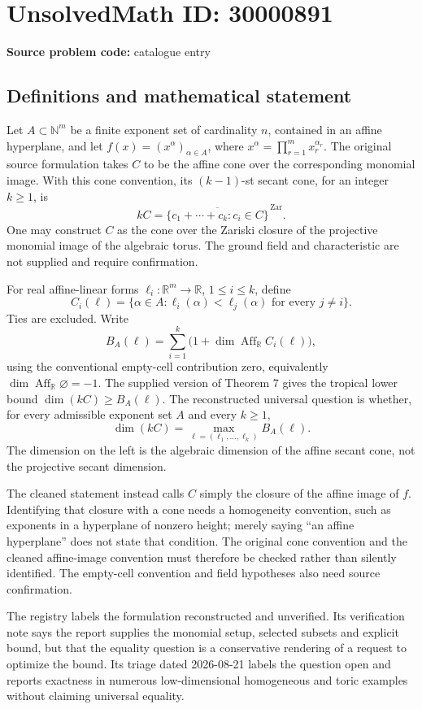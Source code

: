 \documentclass[11pt]{article}
\newcommand{\N}{\mathbb{N}}
\newcommand{\R}{\mathbb{R}}
\begin{document}
\section*{UnsolvedMath ID: 30000891}
\textbf{Source problem code:} catalogue entry
\subsection{Definitions and mathematical statement}
Let $A\subset\N^m$ be a finite exponent set of cardinality $n$, contained in an affine hyperplane, and let $f(x)=(x^\alpha)_{\alpha\in A}$, where $x^\alpha=\prod_{r=1}^m x_r^{\alpha_r}$. The original source formulation takes $C$ to be the affine cone over the corresponding monomial image. With this cone convention, its $(k-1)$-st secant cone, for an integer $k\geq1$, is
\[
kC=\overline{\{c_1+\cdots+c_k:c_i\in C\}}^{\,\mathrm{Zar}}.
\]
One may construct $C$ as the cone over the Zariski closure of the projective monomial image of the algebraic torus. The ground field and characteristic are not supplied and require confirmation.

For real affine-linear forms $\ell_i:\R^m\to\R$, $1\leq i\leq k$, define
\[
C_i(\ell)=\{\alpha\in A:\ell_i(\alpha)<\ell_j(\alpha)\text{ for every }j\ne i\}.
\]
Ties are excluded. Write
\[
B_A(\ell)=\sum_{i=1}^k\bigl(1+\dim\operatorname{Aff}_{\R}C_i(\ell)\bigr),
\]
using the conventional empty-cell contribution zero, equivalently $\dim\operatorname{Aff}_{\R}\varnothing=-1$. The supplied version of Theorem 7 gives the tropical lower bound $\dim(kC)\geq B_A(\ell)$. The reconstructed universal question is whether, for every admissible exponent set $A$ and every $k\geq1$,
\[
\dim(kC)=\max_{\ell=(\ell_1,\ldots,\ell_k)}B_A(\ell).
\]
The dimension on the left is the algebraic dimension of the affine secant cone, not the projective secant dimension.

The cleaned statement instead calls $C$ simply the closure of the affine image of $f$. Identifying that closure with a cone needs a homogeneity convention, such as exponents in a hyperplane of nonzero height; merely saying ``an affine hyperplane'' does not state that condition. The original cone convention and the cleaned affine-image convention must therefore be checked rather than silently identified. The empty-cell convention and field hypotheses also need source confirmation.

The registry labels the formulation reconstructed and unverified. Its verification note says the report supplies the monomial setup, selected subsets and explicit bound, but that the equality question is a conservative rendering of a request to optimize the bound. Its triage dated 2026-08-21 labels the question open and reports exactness in numerous low-dimensional homogeneous and toric examples without claiming universal equality.
\end{document}
